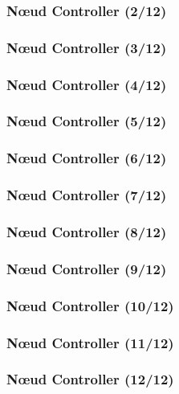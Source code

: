   \begin{frame}
   \frametitle{N\oe{}ud Controller (2/12)}
   
    
   
  \end{frame}
  \begin{frame}
   \frametitle{N\oe{}ud Controller (3/12)}
   
    
   
  \end{frame}
  \begin{frame}
   \frametitle{N\oe{}ud Controller (4/12)}
   
    
   
  \end{frame}
  \begin{frame}
   \frametitle{N\oe{}ud Controller (5/12)}
   
    
   
  \end{frame}
  \begin{frame}
   \frametitle{N\oe{}ud Controller (6/12)}
   
    
   
  \end{frame}
  \begin{frame}
   \frametitle{N\oe{}ud Controller (7/12)}
   
    
   
  \end{frame}
  \begin{frame}
   \frametitle{N\oe{}ud Controller (8/12)}
   
    
   
  \end{frame}
  \begin{frame}
   \frametitle{N\oe{}ud Controller (9/12)}
   
    
   
  \end{frame}
  \begin{frame}
   \frametitle{N\oe{}ud Controller (10/12)}
   
    
   
  \end{frame}
  \begin{frame}
   \frametitle{N\oe{}ud Controller (11/12)}
   
    
   
  \end{frame}
  \begin{frame}
   \frametitle{N\oe{}ud Controller (12/12)}
   
    
   
  \end{frame}

